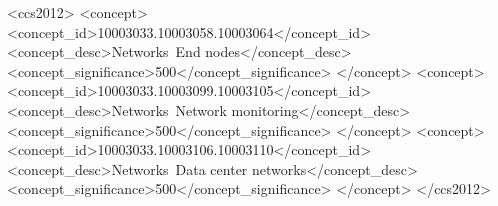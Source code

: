 \newcommand\sectionprelude{\vspace{-0.5ex}}
\newcommand\sectionpostlude{\vspace{-0.5ex}}
\newcommand\subsectionprelude{\vspace{-0.5ex}}
\newcommand\subsectionpostlude{\vspace{-0ex}}
\newcommand\paraspace{\vspace*{-2ex}}

\newcommand\nostarsection[1]{\sectionprelude\origsection{#1}\sectionpostlude}
\newcommand\starsection[1]{\sectionprelude\origsection*{#1}\sectionpostlude}

\newcommand\nostarsubsection[1]{\subsectionprelude\origsubsection{#1}\subsectionpostlude}
\newcommand\starssubection[1]{\subsectionprelude\origsubsection*{#1}\subsectionpostlude}

\newcommand\starpara[1]{\paraspace\noindent\origparagraph*{\textbf{#1}}}
\newcommand\nostarpara[1]{\paraspace\noindent\origparagraph*{\textbf{#1}}}
\newcommand\subparagraph[1]{\paraspace\noindent\origparagraph*{\textit{#1}}}
\makeatother



\begin{CCSXML}
<ccs2012>
<concept>
<concept_id>10003033.10003058.10003064</concept_id>
<concept_desc>Networks~End nodes</concept_desc>
<concept_significance>500</concept_significance>
</concept>
<concept>
<concept_id>10003033.10003099.10003105</concept_id>
<concept_desc>Networks~Network monitoring</concept_desc>
<concept_significance>500</concept_significance>
</concept>
<concept>
<concept_id>10003033.10003106.10003110</concept_id>
<concept_desc>Networks~Data center networks</concept_desc>
<concept_significance>500</concept_significance>
</concept>
</ccs2012>
\end{CCSXML}


\makeatletter
{}
\makeatother


